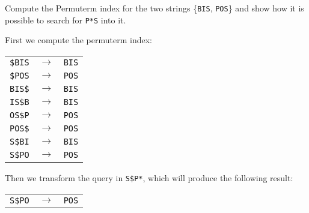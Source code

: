 \exercise

Compute the Permuterm index for the two strings \{\texttt{BIS}, \texttt{POS}\}
and show how it is possible to search for \texttt{P*S} into it.

\solution

First we compute the permuterm index:
%
\begin{longtable}{ccc}
  \texttt{\$BIS} & $\rightarrow$ & \texttt{BIS} \\
  \texttt{\$POS} & $\rightarrow$ & \texttt{POS} \\
  \texttt{BIS\$} & $\rightarrow$ & \texttt{BIS} \\
  \texttt{IS\$B} & $\rightarrow$ & \texttt{BIS} \\
  \texttt{OS\$P} & $\rightarrow$ & \texttt{POS} \\
  \texttt{POS\$} & $\rightarrow$ & \texttt{POS} \\
  \texttt{S\$BI} & $\rightarrow$ & \texttt{BIS} \\
  \texttt{S\$PO} & $\rightarrow$ & \texttt{POS} \\
\end{longtable}
%
Then we transform the query in \texttt{S\$P*}, which will produce the following
result:
%
\begin{table}[H]
  \centering
  \begin{tabular}{ccc}
    \texttt{S\$PO} & $\rightarrow$ & \texttt{POS} \\
  \end{tabular}
\end{table}
